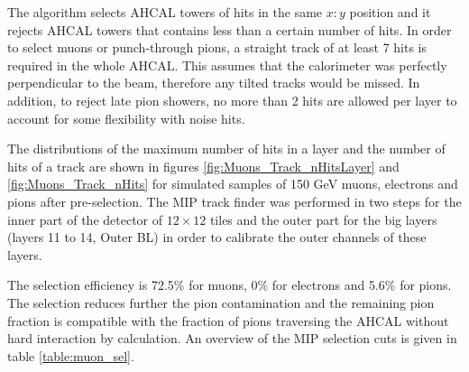 The algorithm selects AHCAL towers of hits in the same $x:y$ position and it rejects AHCAL towers that contains less than a certain number of hits. In order to select muons or punch-through pions, a straight track of at least 7 hits is required in the whole AHCAL. This assumes that the calorimeter was perfectly perpendicular to the beam, therefore any tilted tracks would be missed. In addition, to reject late pion showers, no more than 2 hits are allowed per layer to account for some flexibility with noise hits.

The distributions of the maximum number of hits in a layer and the number of hits of a track are shown in figures \ref{fig:Muons_Track_nHitsLayer} and \ref{fig:Muons_Track_nHits} for simulated samples of 150 GeV muons, electrons and pions after pre-selection. The MIP track finder was performed in two steps for the inner part of the detector of $12 \times 12$ tiles and the outer part for the big layers (layers 11 to 14, Outer BL) in order to calibrate the outer channels of these layers.

The selection efficiency is 72.5\% for muons, 0\% for electrons and 5.6\% for pions. The selection reduces further the pion contamination and the remaining pion fraction is compatible with the fraction of pions traversing the AHCAL without hard interaction by calculation. An overview of the MIP selection cuts is given in table \ref{table:muon_sel}.

